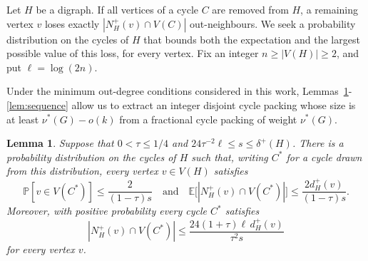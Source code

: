 \documentclass[10pt,a4paper]{article}
\newtheorem{lemma}[theorem]{Lemma}
\numberwithin{equation}{section}
\begin{document}
Let $H$ be a digraph. If all vertices of a cycle 
$C$ are removed from $H$, a remaining vertex $v$ loses exactly 
$|N_H^+(v)\cap V(C)|$ out-neighbours. We seek a probability distribution on the cycles of $H$ 
that bounds both the expectation and the largest possible value of this 
loss, for every vertex.
Fix an integer $n\ge|V(H)|\ge2$, and put $\ell=\log(2n)$.

Under the minimum out-degree conditions considered in this work, Lemmas~\ref{lem:distribution}-\ref{lem:sequence} allow us to extract an integer disjoint cycle packing whose size is at least $\nu^{\ast}(G)-o(k)$ from a fractional cycle packing of weight $\nu^{\ast}(G)$.


\begin{lemma}\label{lem:distribution}
Suppose that $0<\tau\le1/4$ and
$24\tau^{-2}\ell\le s\le\delta^+(H)$.
There is a probability distribution on the cycles of $H$ such that,
writing $C^\ast$ for a cycle drawn from this distribution, every
vertex $v\in V(H)$ satisfies
$$
\mathbb P[v\in V(C^\ast)]\le\frac{2}{(1-\tau)s}
\quad\text{and}\quad
\mathbb E\bigl[|N_H^+(v)\cap V(C^\ast)|\bigr]
\le\frac{2d_H^+(v)}{(1-\tau)s}.
$$
Moreover, with positive probability  every cycle $C^\ast$ satisfies
$$
|N_H^+(v)\cap V(C^\ast)|
\le\frac{24(1+\tau)\ell\,d_H^+(v)}{\tau^2s}
$$
for every vertex $v$.
\end{lemma}
\end{document}
